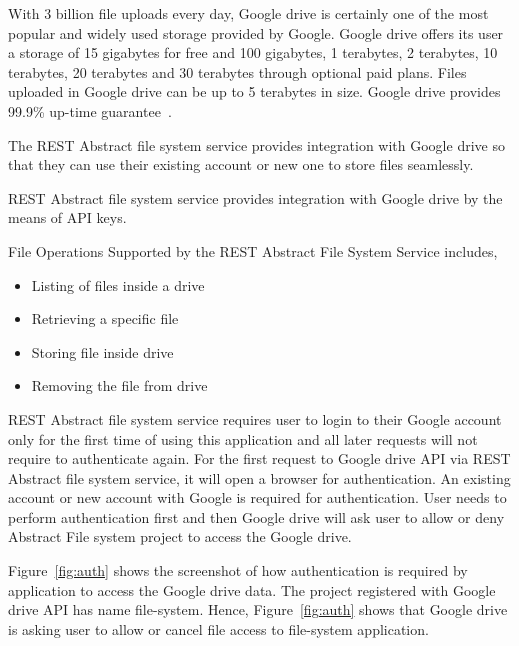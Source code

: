 With 3 billion file uploads every day, Google drive is certainly one of the 
most popular and widely used storage provided by Google. Google drive offers 
its user a storage of 15 gigabytes for free and 100 gigabytes, 1 terabytes, 2 
terabytes, 10 terabytes, 20 terabytes and 30 terabytes through optional paid 
plans. Files uploaded in Google drive can be up to 5 terabytes in size. Google 
drive provides 99.9\% up-time guarantee~\cite{hid-sp18-420-google-drive-wiki}. 

The REST Abstract file system service provides integration with Google
drive so that they can use their existing account or new one to store
files seamlessly.

REST Abstract file system service provides integration with 
Google drive by the means of API keys. 

File Operations Supported by the REST Abstract File System Service includes,
\begin{itemize}
    \item  Listing of files inside a drive
    \item  Retrieving a specific file 
    \item  Storing file inside drive
    \item  Removing the file from drive
\end{itemize}

REST Abstract file system service requires user to login to 
their Google account only for the first time of using 
this application and all later requests will not require to 
authenticate again.
For the first request to Google drive API via REST Abstract file 
system service, it will open a browser for authentication. 
An existing account or new account with Google is required 
for authentication.
User needs to perform authentication first and then Google drive will
ask user to allow or deny Abstract File system project to access 
the Google drive.

Figure~\ref{fig:auth} shows the screenshot of how authentication is 
required by application to access the Google drive data. 
The project registered with Google drive API has name file-system. 
Hence, Figure~\ref{fig:auth} shows that Google drive is asking user 
to allow or cancel file access to file-system application. 

